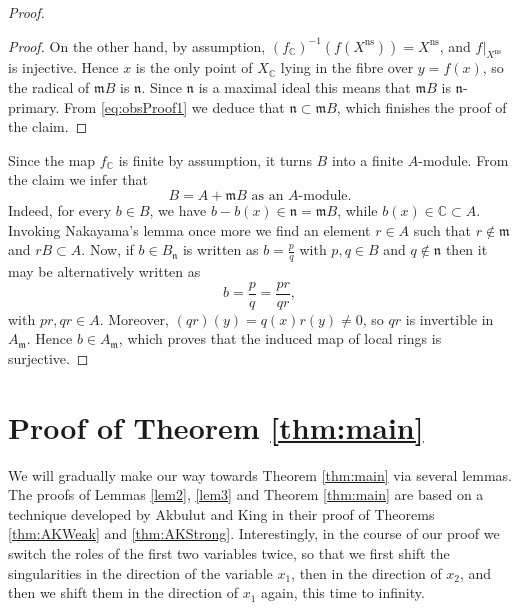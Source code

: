 \documentclass{amsart}
\theoremstyle{plain}
\theoremstyle{definition}
\theoremstyle{remark}
\numberwithin{equation}{thm} %
\newcommand{\C}{\mathbb{C}}
\newcommand{\ns}{\mathrm{ns}}
\begin{document}
\begin{proof}
\begin{proof}
On the other hand, by assumption, $(f_\C)^{-1}(f(X^\ns))=X^\ns$, and $f|_{X^\ns}$ is
injective. Hence $x$ is the only point of $X_\C$ lying in the fibre over $y=f(x)$, so the radical of $\mathfrak mB$ is $\mathfrak n$. Since $\mathfrak n$ is a maximal ideal this means that $\mathfrak m B$ is $\mathfrak n$-primary. From \eqref{eq:obsProof1} we deduce that $\mathfrak n\subset \mathfrak m B$, which finishes the proof of the claim.
\end{proof}
Since the map $f_\C$ is finite by assumption, it turns $B$ into a finite $A$-module. From the claim we infer that
\begin{equation*}
    B=A+\mathfrak m B\text{ as an $A$-module.}
\end{equation*}
Indeed, for every \(b\in B\), we have \(b-b(x)\in\mathfrak n=\mathfrak mB\), while \(b(x)\in\C\subset A\). Invoking Nakayama's lemma once more we find an element $r\in A$ such that $r\not \in \mathfrak m$ and $rB\subset A$. Now, if $b\in B_{\mathfrak n}$ is written as $b=\frac{p}{q}$ with $p,q\in B$ and $q\not \in \mathfrak n$ then it may be alternatively written as
\begin{equation*}
    b=\frac{p}{q}=\frac{pr}{qr},
\end{equation*}
with $pr,qr\in A$. Moreover, $(qr)(y)=q(x)r(y)\neq 0$, so $qr$ is invertible in $A_\mathfrak m$. Hence $b\in A_\mathfrak m$, which proves that the induced map of local rings is surjective.
\end{proof}



\section{Proof of Theorem \ref{thm:main}}\label{sec:mainProof}
We will gradually make our way towards Theorem \ref{thm:main} via several lemmas. The proofs of Lemmas \ref{lem2}, \ref{lem3} and Theorem \ref{thm:main} are based on a  technique developed by Akbulut and King in their proof of Theorems \ref{thm:AKWeak} and \ref{thm:AKStrong}. Interestingly, in the course of our proof we switch the roles of the first two variables twice, so that we first shift the singularities in the direction of the variable $x_1$, then in the direction of $x_2$, and then we shift them in the direction of $x_1$ again, this time to infinity.
\end{document}
